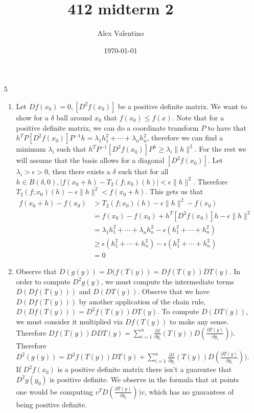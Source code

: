 \documentclass[12pt, letterpaper]{article}
\date{\today}
\author{Alex Valentino}
\title{412 midterm 2}
\begin{document}
\begin{enumerate}
	\item[5]
	\begin{enumerate}
		\item Let $Df(x_0) = 0, [D^2 f(x_0)]$ be a positive 
		definite matrix.  We want to show for a $\delta$ ball 
		around $x_0$ that $f(x_0) \leq f(x)$.  Note that 
		for a positive definite matrix, we can do a coordinate 
		transform $P$ to have that $h^T P [D^2 f(x_0)] P^{-1} h = \lambda_1 h_1^2 + \cdots + \lambda_n h_n^2$, therefore we can 
		find a minimum $\lambda_i$ such that $h^T P^{-1} [D^2 f(x_0)] P^ h \geq \lambda_i \lVert h \rVert^2$.  For the rest 
		we will assume that the basis allows for a diagonal 
		$[D^2 f(x_0)]$.  Let $\lambda_i > \epsilon >0$, then 
		there exists a $\delta$ such that for all 
		$h \in B(\delta,0), |f(x_0+h) - T_2(f;x_0)(h)| < \epsilon
		\|h\|^2$.
		Therefore $T_2(f;x_0)(h) - \epsilon \|h \|^2 < f(x_0+h)$.
		This gets us that \begin{align*}
			f(x_0 +h) - f(x_0) &>T_2(f;x_0)(h) - \epsilon \|h \|^2 - f(x_0)\\
			&= f(x_0) - f(x_0) + h^T [D^2 f(x_0)] h- \epsilon \|h \|^2 \\
			&= \lambda_1 h_1^2 + \cdots + \lambda_n h_n^2 - \epsilon(h_1^2 + \cdots + h_n^2)\\
			&\geq \epsilon(h_1^2 + \cdots + h_n^2) - \epsilon(h_1^2 + \cdots + h_n^2)\\
			&= 0
\end{align*}		  
		\item Observe that $D(g(y)) = D(f(T(y)) = Df (T(y)) DT(y)$.
		In order to compute $D^2 g(y)$, we must compute the 
		intermediate terms $D(Df (T(y)))$ and $D(DT(y))$.  
		Observe that we have $D(Df (T(y)))$ by another 
		application of the chain rule, $D(Df (T(y))) = 
		D^2 f(T(y)) DT(y)$.  To compute $D(DT(y))$, we 
		must consider it multiplied via $Df (T(y))$ to make 
		any sense.  Therefore $Df (T(y)) DDT(y) = \sum_{i=1}^n
		\frac{\partial f }{\partial y_i}(T(y)) D(\frac{\partial T(y)}{\partial y_i}))$.  
		Therefore $D^2(g(y)) = D^2 f(T(y)) DT(y) + \sum_{i=1}^n
		\frac{\partial f }{\partial y_i}(T(y)) D(\frac{\partial T(y)}{\partial y_i}))$.  If $D^2 f(x_0)$ is a positive definite 
		matrix there isn't a guarentee that $D^2 g(y_0)$ is 
		positive definite.  We observe in the formula that at 
		points one would be computing $v^T D(\frac{\partial T(y)}{\partial y_i})) v$, which has no guarantees of being positive 
		definite.  
	\end{enumerate}

\end{enumerate}
\end{document}
